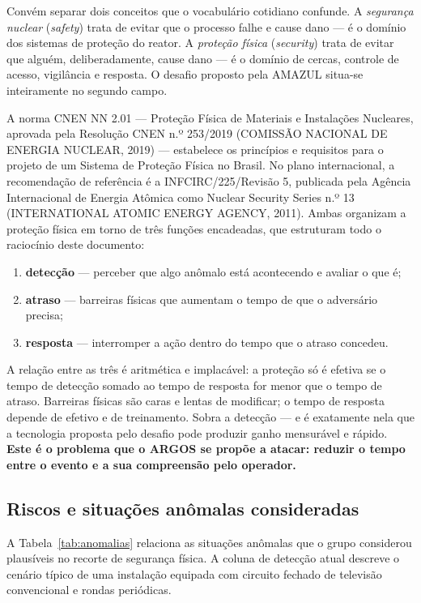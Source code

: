 \documentclass[12pt,a4paper,oneside]{article}
\begin{document}
Convém separar dois conceitos que o vocabulário cotidiano confunde. A
\emph{segurança nuclear} (\emph{safety}) trata de evitar que o processo falhe e
cause dano — é o domínio dos sistemas de proteção do reator. A \emph{proteção
física} (\emph{security}) trata de evitar que alguém, deliberadamente, cause
dano — é o domínio de cercas, controle de acesso, vigilância e resposta. O
desafio proposto pela AMAZUL situa-se inteiramente no segundo campo.

A norma CNEN NN 2.01 — Proteção Física de Materiais e Instalações Nucleares,
aprovada pela Resolução CNEN n.º 253/2019 (COMISSÃO NACIONAL DE ENERGIA
NUCLEAR, 2019) — estabelece os princípios e requisitos para o projeto de um
Sistema de Proteção Física no Brasil. No plano internacional, a recomendação de
referência é a INFCIRC/225/Revisão 5, publicada pela Agência Internacional de
Energia Atômica como Nuclear Security Series n.º 13 (INTERNATIONAL ATOMIC
ENERGY AGENCY, 2011). Ambas organizam a proteção física em torno de três
funções encadeadas, que estruturam todo o raciocínio deste documento:

\begin{enumerate}[leftmargin=*,itemsep=2pt,topsep=4pt]
  \item \textbf{detecção} — perceber que algo anômalo está acontecendo e
        avaliar o que é;
  \item \textbf{atraso} — barreiras físicas que aumentam o tempo de que o
        adversário precisa;
  \item \textbf{resposta} — interromper a ação dentro do tempo que o atraso
        concedeu.
\end{enumerate}

A relação entre as três é aritmética e implacável: a proteção só é efetiva se o
tempo de detecção somado ao tempo de resposta for menor que o tempo de atraso.
Barreiras físicas são caras e lentas de modificar; o tempo de resposta depende
de efetivo e de treinamento. Sobra a detecção — e é exatamente nela que a
tecnologia proposta pelo desafio pode produzir ganho mensurável e rápido.
\textbf{Este é o problema que o ARGOS se propõe a atacar: reduzir o tempo entre
o evento e a sua compreensão pelo operador.}

\subsection{Riscos e situações anômalas consideradas}

A Tabela~\ref{tab:anomalias} relaciona as situações anômalas que o grupo
considerou plausíveis no recorte de segurança física. A coluna de detecção
atual descreve o cenário típico de uma instalação equipada com circuito fechado
de televisão convencional e rondas periódicas.
\end{document}
